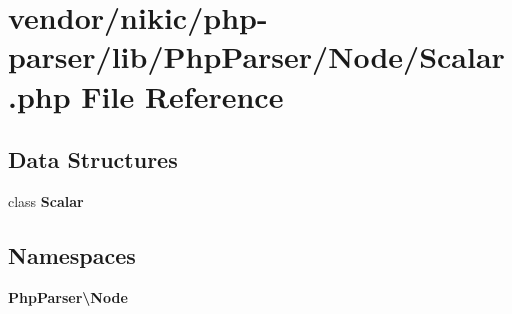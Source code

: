\section{vendor/nikic/php-\/parser/lib/\+Php\+Parser/\+Node/\+Scalar.php File Reference}
\label{_scalar_8php}
\subsection*{Data Structures}
\begin{DoxyCompactItemize}
\item 
class {\bf Scalar}
\end{DoxyCompactItemize}
\subsection*{Namespaces}
\begin{DoxyCompactItemize}
\item 
 {\bf Php\+Parser\textbackslash{}\+Node}
\end{DoxyCompactItemize}
